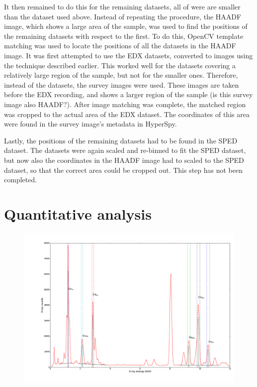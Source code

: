 It then remained to do this for the remaining datasets, all of were are smaller than the dataset used above. Instead of repeating the procedure, the HAADF image, which shows a large area of the sample, was used to find the positions of the remaining datasets with respect to the first. To do this, OpenCV template matching was used to locate the positions of all the datasets in the HAADF image. It was first attempted to use the EDX datasets, converted to images using the technique described earlier. This worked well for the datasets covering a relatively large region of the sample, but not for the smaller ones. Therefore, instead of the datasets, the survey images were used. These images are taken before the EDX recording, and shows a larger region of the sample (is this survey image also HAADF?). After image matching was complete, the matched region was cropped to the actual area of the EDX dataset. The coordinates of this area were found in the survey image's metadata in HyperSpy. 

Lastly, the positions of the remaining datasets had to be found in the SPED dataset. The datasets were again scaled and re-binned to fit the SPED dataset, but now also the coordinates in the HAADF image had to scaled to the SPED dataset, so that the correct area could be cropped out. This step has not been completed.

\section{Quantitative analysis}

\begin{figure}
	\centering
	\includegraphics[width=0.7\linewidth]{fig/other/UnheatedA-full-spectrum2}
	\caption{}
	\label{fig:spectrum-with-info}
\end{figure}

